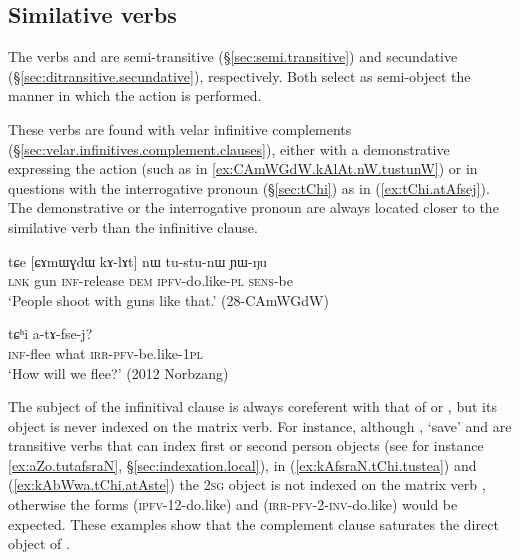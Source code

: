 \subsection{Similative verbs}  \label{sec:similative.verb.complementation}
The verbs  and   are semi-transitive (§\ref{sec:semi.transitive}) and secundative (§\ref{sec:ditransitive.secundative}), respectively. Both select as semi-object the manner in which the action is performed.

These verbs are found with velar infinitive complements (§\ref{sec:velar.infinitives.complement.clauses}), either with a demonstrative expressing the action (such as  in \ref{ex:CAmWGdW.kAlAt.nW.tustunW}) or in questions with the interrogative pronoun  (§\ref{sec:tChi}) as in (\ref{ex:tChi.atAfsej}). The demonstrative or the interrogative pronoun are always located closer to the similative verb than the infinitive clause.

\begin{exe}
\ex \label{ex:CAmWGdW.kAlAt.nW.tustunW}
 \gll tɕe [ɕɤmɯɣdɯ kɤ-lɤt] nɯ tu-stu-nɯ ɲɯ-ŋu \\
 \textsc{lnk} gun \textsc{inf}-release \textsc{dem} \textsc{ipfv}-do.like-\textsc{pl} \textsc{sens}-be \\
 \glt `People shoot with guns like that.' (28-CAmWGdW)
\end{exe}

 \begin{exe}
\ex \label{ex:tChi.atAfsej}
\gll  [kɤ-pʰɣo] tɕʰi a-tɤ-fse-j?    \\
\textsc{inf}-flee what \textsc{irr}-\textsc{pfv}-be.like-\textsc{1pl} \\
\glt  `How will we flee?' (2012 Norbzang)
\end{exe} 

The subject of the infinitival clause is always coreferent with that of  or , but its object is never indexed on the matrix verb. For instance, although , `save' and  are transitive verbs that can index first or second person objects (see for instance \ref{ex:aZo.tutafsraN}, §\ref{sec:indexation.local}), in (\ref{ex:kAfsraN.tChi.tustea}) and (\ref{ex:kAbWwa.tChi.atAste})  the \textsc{2sg} object is not indexed on the matrix verb , otherwise the forms  (\textsc{ipfv}-1\fl{}2-do.like) and  (\textsc{irr}-\textsc{pfv}-2-\textsc{inv}-do.like) would be expected. These examples show that the complement clause saturates the direct object of .

